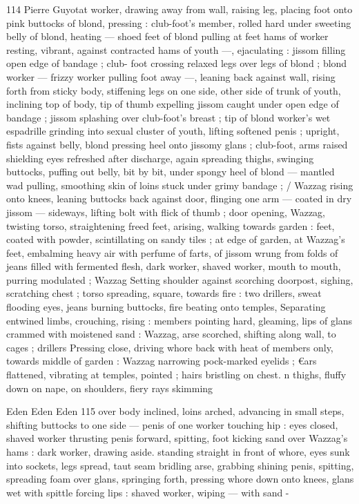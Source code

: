 114 Pierre Guyotat
worker, drawing away from wall, raising leg, placing foot onto pink
buttocks of blond, pressing : club-foot's member, rolled hard under
sweeting belly of blond, heating — shoed feet of blond pulling at
feet hams of worker resting, vibrant, against contracted hams of
youth —, ejaculating : jissom filling open edge of bandage ; club-
foot crossing relaxed legs over legs of blond ; blond worker — frizzy
worker pulling foot away —, leaning back against wall, rising forth
from sticky body, stiffening legs on one side, other side of trunk of
youth, inclining top of body, tip of thumb expelling jissom caught
under open edge of bandage ; jissom splashing over club-foot's
breast ; tip of blond worker's wet espadrille grinding into sexual
cluster of youth, lifting softened penis ; upright, fists against belly,
blond pressing heel onto jissomy glans ; club-foot, arms raised
shielding eyes refreshed after discharge, again spreading thighs,
swinging buttocks, puffing out belly, bit by bit, under spongy heel of
blond — mantled wad pulling, smoothing skin of loins stuck under
grimy bandage ; / Wazzag rising onto knees, leaning buttocks back
against door, flinging one arm — coated in dry jissom — sideways,
lifting bolt with flick of thumb ; door opening, Wazzag, twisting torso,
straightening freed feet, arising, walking towards garden : feet,
coated with powder, scintillating on sandy tiles ; at edge of garden,
at Wazzag's feet, embalming heavy air with perfume of farts, of
jissom wrung from folds of jeans filled with fermented flesh, dark
worker, shaved worker, mouth to mouth, purring modulated ; Wazzag
Setting shoulder against scorching doorpost, sighing, scratching
chest ; torso spreading, square, towards fire : two drillers, sweat
flooding eyes, jeans burning buttocks, fire beating onto temples,
Separating entwined limbs, crouching, rising : members pointing
hard, gleaming, lips of glans crammed with moistened sand :
Wazzag, arse scorched, shifting along wall, to cages ; drillers
Pressing close, driving whore back with heat of members only,
towards middle of garden : Wazzag narrowing pock-marked eyelids ;
€ars flattened, vibrating at temples, pointed ; hairs bristling on chest.
n thighs, fluffy down on nape, on shoulders, fiery rays skimming

Eden Eden Eden 115
over body inclined, loins arched, advancing in small steps, shifting
buttocks to one side — penis of one worker touching hip : eyes
closed, shaved worker thrusting penis forward, spitting, foot kicking
sand over Wazzag's hams : dark worker, drawing aside. standing
straight in front of whore, eyes sunk into sockets, legs spread, taut
seam bridling arse, grabbing shining penis, spitting, spreading foam
over glans, springing forth, pressing whore down onto knees, glans
wet with spittle forcing lips : shaved worker, wiping — with sand -

